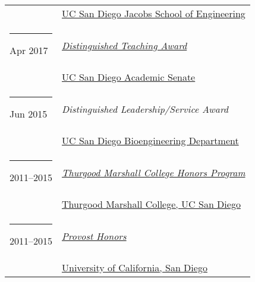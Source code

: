 \documentclass[margin,line]{res}
\begin{document}
\begin{resume}
\begin{longtable}{@{}p{0.7in}p{4in}}
\hspace*{-4mm} \hspace*{-4mm} & \hspace{4mm} \href{https://jacobsschool.ucsd.edu/}{UC San Diego Jacobs School of Engineering}\\
\hspace*{-4mm} \rule{-1mm}{5mm} Apr 2017 & \href{https://senate.ucsd.edu/grants-awards/senate-awards/distinguished-teaching-award/recipient-history}{\textit{Distinguished Teaching Award}}\\*
\hspace*{-4mm} \hspace*{-4mm} & \hspace{4mm} \href{https://senate.ucsd.edu/}{UC San Diego Academic Senate}\\
\hspace*{-4mm} \rule{-1mm}{5mm} Jun 2015 & \textit{Distinguished Leadership/Service Award}\\*
\hspace*{-4mm} \hspace*{-4mm} & \hspace{4mm} \href{http://bioengineering.ucsd.edu/}{UC San Diego Bioengineering Department}\\
\hspace*{-4mm} \rule{-1mm}{5mm} 2011--2015 & \href{https://marshall.ucsd.edu/academics/academic-opportunities/tmc-honors-program.html}{\textit{Thurgood Marshall College Honors Program}}\\*
\hspace*{-4mm} \hspace*{-4mm} & \hspace{4mm} \href{https://marshall.ucsd.edu/}{Thurgood Marshall College, UC San Diego}\\
\hspace*{-4mm} \rule{-1mm}{5mm} 2011--2015 & \href{https://roosevelt.ucsd.edu/academics/Academic\%20Opportunities/honors/index.html#Provost-Honors}{\textit{Provost Honors}}\\*
\hspace*{-4mm} \hspace*{-4mm} & \hspace{4mm} \href{http://ucsd.edu/}{University of California, San Diego}\\
\end{longtable}


\end{resume}
\end{document}
